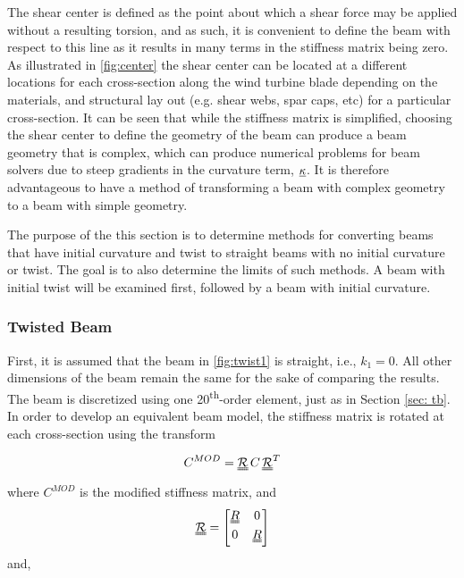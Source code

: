 \documentclass[letterpaper,12pt]{article}
\begin{document}

The shear center is defined as the point about which a shear force may be applied without a resulting torsion, and as such, it is convenient to define the beam with respect to this line as it results in many terms in the stiffness matrix being zero. As illustrated in \ref{fig:center} the shear center can be located at a different locations for each cross-section along the wind turbine blade depending on the materials, and structural lay out (e.g. shear webs, spar caps, etc) for a particular cross-section. It can be seen that while the stiffness matrix is simplified, choosing the shear center to define the geometry of the beam can produce a beam geometry that is complex, which can produce numerical problems for beam solvers due to steep gradients in the curvature term, $\uline{\kappa}$. It is therefore advantageous to have a method of transforming a beam with complex geometry to a beam with simple geometry. 

The purpose of the this section is to determine methods for converting beams that have initial curvature and twist to straight beams with no initial curvature or twist. The goal is to also determine the limits of such methods. A beam with initial twist will be examined first, followed by a beam with initial curvature. 

\subsubsection{Twisted Beam}
First, it is assumed that the beam in \ref{fig:twist1} is straight, i.e., $k_1=0$. All other dimensions of the beam remain the same for the sake of comparing the results. The beam is discretized using one 20\textsuperscript{th}-order element, just as in Section \ref{sec: tb}. In order to develop an equivalent beam model, the stiffness matrix is rotated at each cross-section using the transform 

\begin{equation*}
{C}^{MOD}=\uuline{\mathcal{R}}\, {C}\, \uuline{\mathcal{R}}^T
\end{equation*}
where ${C}^{MOD}$ is the modified stiffness matrix, and
\begin{equation*}
\uuline{\mathcal{R}}=\begin{bmatrix}	\uuline{R} & 0   \\	0  & \uuline{R}   \\ \end{bmatrix}
\end{equation*}
and, 
\end{document}
